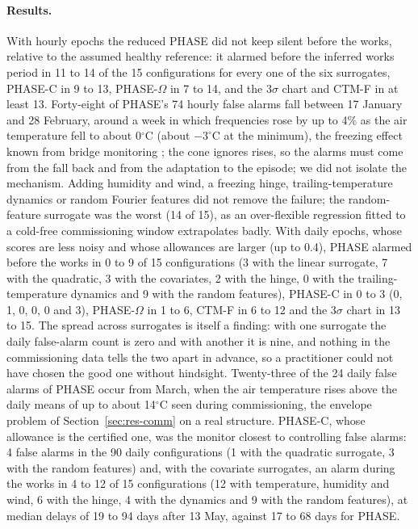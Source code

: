 \documentclass[12pt,a4paper]{article}
\newenvironment{revblock}{}{}
\newenvironment{revblock}{\begingroup\color{revcol}}{\endgroup}
\newcommand{\rtwo}[1]{#1}
\newcommand{\rtwo}[1]{{\color{revcolb}#1}}
\begin{document}
\begin{revblock}
\paragraph{Results.} \rtwo{With hourly epochs the reduced PHASE did not keep silent before the works, relative to the assumed healthy reference: it alarmed before the inferred works period in 11 to 14 of the 15 configurations for every one of the six surrogates, PHASE-C in 9 to 13, PHASE-$\Omega$ in 7 to 14, and the $3\sigma$ chart and CTM-F in at least 13.} Forty-eight of PHASE's 74 hourly false alarms fall between 17 January and 28 February, around a week in which frequencies rose by up to 4\% as the air temperature fell to about 0$^\circ$C (about $-3^\circ$C at the minimum), the freezing effect known from bridge monitoring \citep{peeters2001z24}; the cone ignores rises, so the alarms must come from the fall back and from the adaptation to the episode; we did not isolate the mechanism. Adding humidity and wind, a freezing hinge, trailing-temperature dynamics or random Fourier features did not remove the failure; the random-feature surrogate was the worst (14 of 15), as an over-flexible regression fitted to a cold-free commissioning window extrapolates badly. With daily epochs, whose scores are less noisy and whose allowances are larger (up to 0.4), PHASE alarmed before the works in 0 to 9 of 15 configurations (3 with the linear surrogate, 7 with the quadratic, 3 with the covariates, 2 with the hinge, 0 with the trailing-temperature dynamics and 9 with the random features), PHASE-C in 0 to 3 (0, 1, 0, 0, 0 and 3), PHASE-$\Omega$ in 1 to 6, CTM-F in 6 to 12 and the $3\sigma$ chart in 13 to 15. The spread across surrogates is itself a finding: with one surrogate the daily false-alarm count is zero and with another it is nine, and nothing in the commissioning data tells the two apart in advance, so a practitioner could not have chosen the good one without hindsight. Twenty-three of the 24 daily false alarms of PHASE occur from March, when the air temperature rises above the daily means of up to about 14$^\circ$C seen during commissioning, the envelope problem of Section~\ref{sec:res-comm} on a real structure. PHASE-C, whose allowance is the certified one, was the monitor closest to controlling false alarms: 4 false alarms in the 90 daily configurations (1 with the quadratic surrogate, 3 with the random features) and, with the covariate surrogates, an alarm during the works in 4 to 12 of 15 configurations (12 with temperature, humidity and wind, 6 with the hinge, 4 with the dynamics and 9 with the random features), at median delays of 19 to 94 days after 13 May, against 17 to 68 days for PHASE.


\end{revblock}
\end{document}
